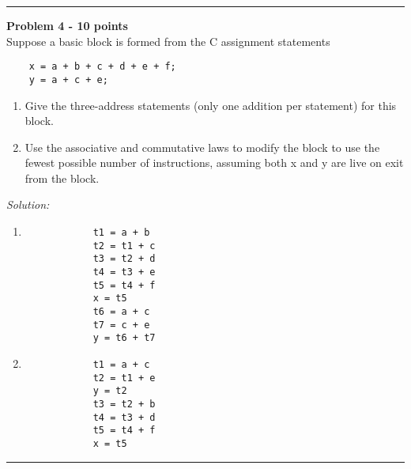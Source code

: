 \documentclass[a4paper, 11pt]{article}
\newenvironment{problem}[2][Problem]
    { \begin{mdframed}[backgroundcolor=gray!20] \textbf{#1 #2} \\}
    {  \end{mdframed}}
\newenvironment{solution}
    {\textit{Solution:}}
    {}
\begin{document}
\noindent\rule{7in}{2.8pt}

\begin{problem}{4 - 10 points}
Suppose a basic block is formed from the C assignment statements
\begin{verbatim}
    x = a + b + c + d + e + f;  
    y = a + c + e;
\end{verbatim}

\begin{enumerate}[a]
    \item Give the three-address statements (only one addition per statement) for  this block.
    \item Use the associative and commutative laws to modify the block to use the  fewest possible number of instructions, assuming both x and y are live on  exit from the block.
\end{enumerate}

\end{problem}

\begin{solution}
    \begin{enumerate}[a]
        \item\begin{verbatim}
            t1 = a + b
            t2 = t1 + c
            t3 = t2 + d
            t4 = t3 + e
            t5 = t4 + f
            x = t5
            t6 = a + c
            t7 = c + e
            y = t6 + t7
        \end{verbatim}
        \item\begin{verbatim}
            t1 = a + c
            t2 = t1 + e
            y = t2
            t3 = t2 + b
            t4 = t3 + d
            t5 = t4 + f
            x = t5
        \end{verbatim}
    \end{enumerate}
\end{solution}


\noindent\rule{7in}{2.8pt}
\end{document}
